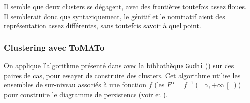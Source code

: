 \documentclass{cours}
\begin{document}
Il semble que deux clusters se dégagent, avec des frontières toutefois assez floues.
Il semblerait donc que syntaxiquement, le génitif et le nominatif aient des représentation assez différentes, sans toutefois savoir à quel point.

\subsubsection{Clustering avec ToMATo}\label{subsub:tomato}
On applique l'algorithme présenté dans \cite{ToMATo} avec la bibliothèque \texttt{Gudhi} (\cite{Gudhi}) sur des paires de cas, pour essayer de construire des clusters.
Cet algorithme utilise les ensembles de sur-niveau associés à une fonction $f$ (les $F^{\alpha} = f^{-1}\left(\left[\alpha, +\infty\right[\right)$) pour construire le diagramme de persistence (voir \cite{tldrtda} et \cite{ToMATo}).
\end{document}
